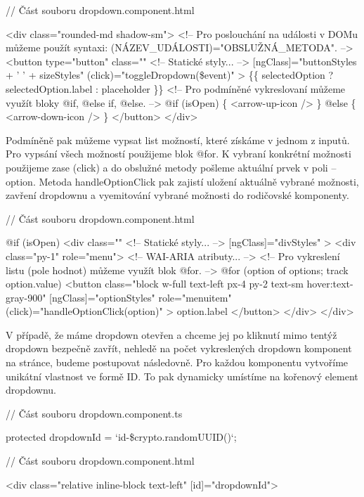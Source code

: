 \begin{prog}
// Část souboru dropdown.component.html

<div class="rounded-md shadow-sm">
  <!-- Pro poslouchání na události v DOMu můžeme 
  použít syntaxi: (NÁZEV_UDÁLOSTI)="OBSLUŽNÁ_METODA". -->
  <button
    type="button"
    class="" <!-- Statické styly... -->
    [ngClass]="buttonStyles + ' ' + sizeStyles"
    (click)="toggleDropdown(\$event)"
  >
    \{\{ selectedOption ? selectedOption.label : placeholder \}\}
    <!-- Pro podmíněné vykreslovaní můžeme využít bloky @if, @else if, @else. -->
    @if (isOpen) \{
      <arrow-up-icon />
    \} @else \{
      <arrow-down-icon />
    \}
  </button>
</div>
\end{prog}

Podmíněně pak můžeme vypsat list možností, které získáme v jednom z inputů. Pro vypsání všech možností použijeme blok @for. 
K vybraní konkrétní možnosti použijeme zase (click) a do obslužné metody pošleme aktuální prvek v poli -- option. 
Metoda handleOptionClick pak zajistí uložení aktuálně vybrané možnosti, zavření dropdownu a vyemitování vybrané možnosti do rodičovské komponenty.

\begin{prog}
// Část souboru dropdown.component.html

@if (isOpen) {
  <div
    class="" <!-- Statické styly... -->
    [ngClass]="divStyles"
  >
    <div class="py-1" role="menu"> <!-- WAI-ARIA atributy... -->
      <!-- Pro vykreslení listu (pole hodnot) můžeme využít blok @for. -->
      @for (option of options; track option.value) {
        <button
          class="block w-full text-left px-4 py-2 text-sm hover:text-gray-900"
          [ngClass]="optionStyles"
          role="menuitem"
          (click)="handleOptionClick(option)"
        >
          {{ option.label }}
        </button>
      }
    </div>
  </div>
}
\end{prog}

V případě, že máme dropdown otevřen a chceme jej po kliknutí mimo tentýž dropdown bezpečně zavřít, nehledě na počet vykreslených dropdown komponent na stránce, budeme postupovat následovně. 
Pro každou komponentu vytvoříme unikátní vlastnost ve formě ID. To pak dynamicky umístíme na kořenový element dropdownu.

\begin{prog}
// Část souboru dropdown.component.ts

protected dropdownId = `id-\${crypto.randomUUID()}`;

// Část souboru dropdown.component.html

<div class="relative inline-block text-left" [id]="dropdownId">
\end{prog}


